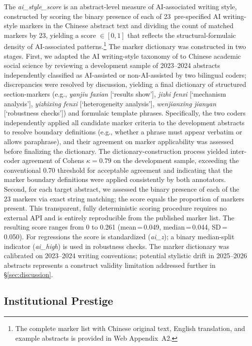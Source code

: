\documentclass[12pt,a4paper]{article}
\begin{document}
The \textit{ai\_style\_score} is an abstract-level measure of AI-associated
writing style, constructed by scoring the binary presence of each of
23~pre-specified AI writing-style markers in the Chinese abstract text
and dividing the count of matched markers by 23, yielding a score
$\in[0,1]$ that reflects the structural-formulaic density of
AI-associated patterns.\footnote{The complete marker list with Chinese
  original text, English translation, and example abstracts is provided
  in Web Appendix~A2.}
The marker dictionary was constructed in two stages.
First, we adapted the AI writing-style taxonomy of \citet{Liang2024}
to Chinese academic social science by reviewing a development sample
of 2023--2024 abstracts independently classified as AI-assisted
or non-AI-assisted by two bilingual coders; discrepancies were resolved
by discussion, yielding a final dictionary of structured section-markers
(e.g., \textit{yanjiu faxian} [`results show'],
\textit{jizhi fenxi} [`mechanism analysis'],
\textit{yizhixing fenxi} [`heterogeneity analysis'],
\textit{wenjianxing jianyan} [`robustness checks'])
and formulaic template phrases.
Specifically, the two coders independently applied all candidate marker
criteria to the development abstracts to resolve boundary definitions
(e.g., whether a phrase must appear verbatim or allows paraphrase),
and their agreement on marker applicability was assessed before
finalizing the dictionary.
The dictionary-construction process yielded inter-coder agreement of
Cohen\textquotesingle s $\kappa = 0.79$ on the development sample,
exceeding the conventional 0.70 threshold for acceptable agreement
and indicating that the marker boundary definitions were applied
consistently by both annotators.
Second, for each target abstract, we assessed the binary presence of
each of the 23 markers via exact string matching; the score equals
the proportion of markers present.
This transparent, fully deterministic scoring procedure requires no
external API and is entirely reproducible from the published marker
list.
The resulting score ranges from 0 to 0.261
(mean\,=\,0.049, median\,=\,0.044, SD\,=\,0.050).
For regressions the score is standardized (\textit{ai\_z}); a binary
median-split indicator (\textit{ai\_high}) is used in robustness checks.
The marker dictionary was calibrated on 2023--2024 writing conventions;
potential stylistic drift in 2025--2026 abstracts represents a
construct validity limitation addressed further in §\ref{sec:discussion}.

\subsection{Institutional Prestige}
\end{document}
